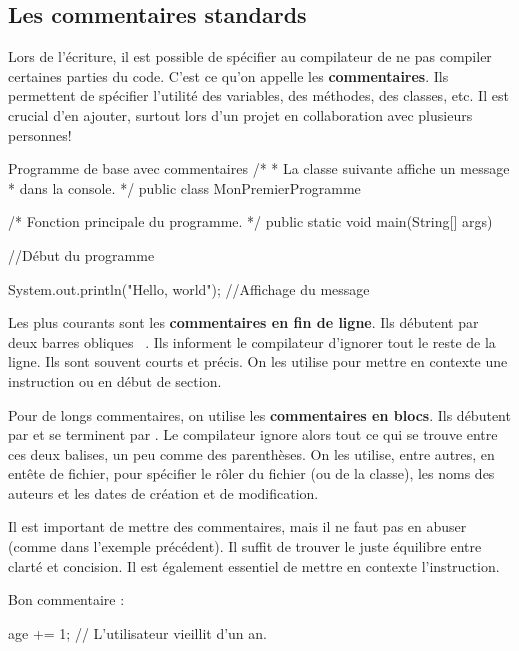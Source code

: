 \documentclass[12pt]{report}
\newcommand{\commande}[1]{%
\tcbox[on line, size=fbox, colframe=black, boxrule=0.75pt, tcbox raise base]{#1} %
}
\begin{document}
\subsection{Les commentaires standards}
%
%
Lors de l'écriture, il est possible de spécifier au compilateur de ne pas compiler certaines parties du code. C'est ce qu'on appelle les \textbf{commentaires}. Ils permettent de spécifier l'utilité des variables, des méthodes, des classes, etc. Il est crucial d'en ajouter, surtout lors d'un projet en collaboration avec plusieurs personnes!

%
%

\begin{MyTCB}{Programme de base avec commentaires}
/* 
 * La classe suivante affiche un message
 * dans la console.
 */
public class MonPremierProgramme {

	/*  Fonction principale
		du programme.		*/
	public static void main(String[] args) {
	
		//Début du programme
		
		System.out.println("Hello, world"); //Affichage du message
		
	}
	
}
\end{MyTCB}
%
%
Les plus courants sont les \textbf{commentaires en fin de ligne}. Ils débutent par deux barres obliques \mbox{\commande{//}.} Ils informent le compilateur d'ignorer tout le reste de la ligne. Ils sont souvent courts et précis. On les utilise pour mettre en contexte une instruction ou en début de section.

Pour de longs commentaires, on utilise les \textbf{commentaires en blocs}. Ils débutent par \commande{/*} et se terminent par \commande{*/}. Le compilateur ignore alors tout ce qui se trouve entre ces deux balises, un peu comme des parenthèses. On les utilise, entre autres, en entête de fichier, pour spécifier le rôler du fichier (ou de la classe), les noms des auteurs et les dates de création et de modification.

Il est important de mettre des commentaires, mais il ne faut pas en abuser (comme dans l'exemple précédent). Il suffit de trouver le juste équilibre entre clarté et concision. Il est également essentiel de mettre en contexte l'instruction.

Bon commentaire :
\begin{code}
age += 1; // L'utilisateur vieillit d'un an.
\end{code}
\end{document}
